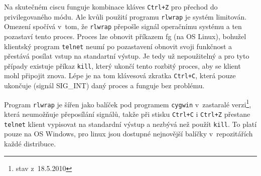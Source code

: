 Na skutečném ciscu funguje kombinace kláves \verb|Ctrl+Z| pro přechod do privilegovaného módu. Ale kvůli použití programu \verb|rlwrap| je systém limitován. Omezení spočívá v~tom, že \verb|rlwrap| přepošle signál operačnímu systému a ten pozastaví tento proces. Proces lze obnovit příkazem fg (na OS Linux), bohužel klientský program \verb|telnet| neumí po pozastavení obnovit svoji funkčnost a přestává posílat vstup na standartní výstup. Je tedy už nepoužitelný a pro tyto případy existuje příkaz \verb|kill|, který ukončí tento rozbitý proces, aby se klient mohl připojit znova. Lépe je na tom klávesová zkratka \verb|Ctrl+C|, která pouze ukončuje (signál SIG\_INT) daný proces a funguje bez problému. 

Program \verb|rlwrap| je šířen jako balíček pod programem \verb|cygwin| v~zastaralé verzi\footnote{stav z~18.5.2010}, která neumožňuje přeposílání signálů, takže při stisku \verb|Ctrl+C| i \verb|Ctrl+Z| přestane \verb|telnet| klient vypisovat na standardní výstup a nezbývá než použít \verb|kill|. To platí pouze na OS Windows, pro linux jsou dostupné nejnovější balíčky v~repozitářích každé distribuce.



